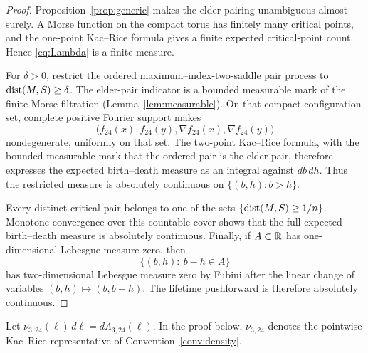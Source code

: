 \begin{proof}
Proposition~\ref{prop:generic} makes the elder pairing unambiguous almost surely. A Morse function on the compact torus has finitely many critical points, and the one-point Kac--Rice formula gives a finite expected critical-point count. Hence \eqref{eq:Lambda} is a finite measure.

For $\delta>0$, restrict the ordered maximum--index-two-saddle pair process to $\operatorname{dist}(M,S)\ge\delta$. The elder-pair indicator is a bounded measurable mark of the finite Morse filtration (Lemma~\ref{lem:measurable}). On that compact configuration set, complete positive Fourier support makes
\[
\bigl(f_{24}(x),f_{24}(y),\nabla f_{24}(x),\nabla f_{24}(y)\bigr)
\]
nondegenerate, uniformly on that set. The two-point Kac--Rice formula, with the bounded measurable mark that the ordered pair is the elder pair, therefore expresses the expected birth--death measure as an integral against $db\,dh$. Thus the restricted measure is absolutely continuous on $\{(b,h):b>h\}$.

Every distinct critical pair belongs to one of the sets $\{\operatorname{dist}(M,S)\ge1/n\}$. Monotone convergence over this countable cover shows that the full expected birth--death measure is absolutely continuous. Finally, if $A\subset\mathbb R$ has one-dimensional Lebesgue measure zero, then
\begin{equation}\tag{1.10}
\{(b,h):\ b-h\in A\}
\end{equation}
has two-dimensional Lebesgue measure zero by Fubini after the linear change of variables $(b,h)\mapsto(b,b-h)$. The lifetime pushforward is therefore absolutely continuous.
\end{proof}

Let $\nu_{3,24}(\ell)\,d\ell=d\Lambda_{3,24}(\ell)$. In the proof below, $\nu_{3,24}$ denotes the pointwise Kac--Rice representative of Convention~\ref{conv:density}.
